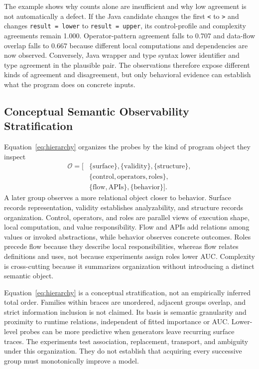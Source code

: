 \documentclass[conference]{IEEEtran}
\begin{document}
The example shows why counts alone are insufficient and why low agreement is not automatically a defect. If the Java candidate changes the first \texttt{<} to \texttt{>} and changes \texttt{result = lower} to \texttt{result = upper}, its control-profile and complexity agreements remain 1.000. Operator-pattern agreement falls to 0.707 and data-flow overlap falls to 0.667 because different local computations and dependencies are now observed. Conversely, Java wrapper and type syntax lower identifier and type agreement in the plausible pair. The observations therefore expose different kinds of agreement and disagreement, but only behavioral evidence can establish what the program does on concrete inputs.

\subsection{Conceptual Semantic Observability Stratification}
Equation~\ref{eq:hierarchy} organizes the probes by the kind of program object they inspect
\begin{equation}
\begin{aligned}
\mathcal{O}=\big[&\{\text{surface}\},\{\text{validity}\},\{\text{structure}\},\\
&\{\text{control},\text{operators},\text{roles}\},\\
&\{\text{flow},\text{APIs}\},\{\text{behavior}\}\big] .
\end{aligned}
\label{eq:hierarchy}
\end{equation}
A later group observes a more relational object closer to behavior. Surface records representation, validity establishes analyzability, and structure records organization. Control, operators, and roles are parallel views of execution shape, local computation, and value responsibility. Flow and APIs add relations among values or invoked abstractions, while behavior observes concrete outcomes. Roles precede flow because they describe local responsibilities, whereas flow relates definitions and uses, not because experiments assign roles lower AUC. Complexity is cross-cutting because it summarizes organization without introducing a distinct semantic object.

Equation~\ref{eq:hierarchy} is a conceptual stratification, not an empirically inferred total order. Families within braces are unordered, adjacent groups overlap, and strict information inclusion is not claimed. Its basis is semantic granularity and proximity to runtime relations, independent of fitted importance or AUC. Lower-level probes can be more predictive when generators leave recurring surface traces. The experiments test association, replacement, transport, and ambiguity under this organization. They do not establish that acquiring every successive group must monotonically improve a model.
\end{document}
